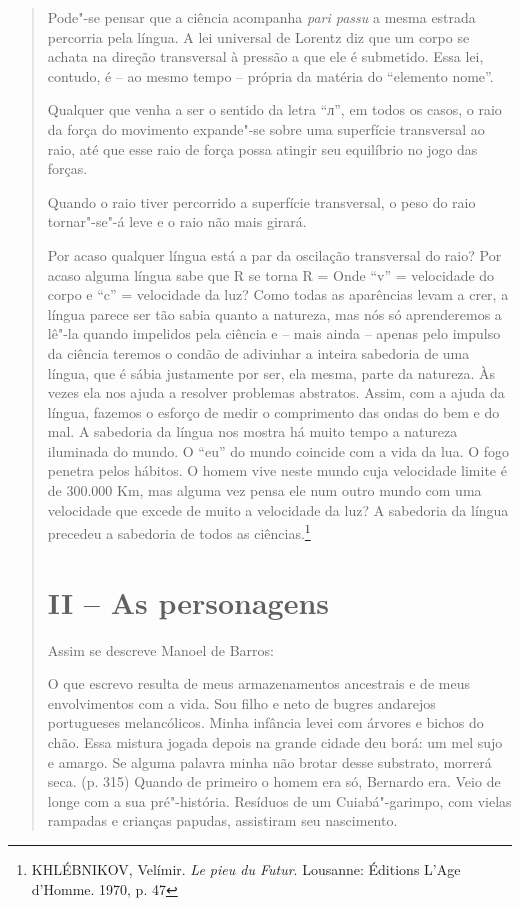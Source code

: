 \begin{quote}
Pode"-se pensar que a ciência acompanha \emph{pari passu} a mesma estrada
percorria pela língua. A lei universal de Lorentz diz que um corpo se
achata na direção transversal à pressão a que ele é submetido. Essa lei,
contudo, é -- ao mesmo tempo -- própria da matéria do ``elemento nome''.

Qualquer que venha a ser o sentido da letra ``л'', em todos os casos, o
raio da força do movimento expande"-se sobre uma superfície transversal
ao raio, até que esse raio de força possa atingir seu equilíbrio no jogo
das forças.

Quando o raio tiver percorrido a superfície transversal, o peso do raio
tornar"-se"-á leve e o raio não mais girará.

Por acaso qualquer língua está a par da oscilação transversal do raio?
Por acaso alguma língua sabe que R se torna R =
Onde ``v'' =
velocidade do corpo e ``c'' = velocidade da luz? Como todas as
aparências levam a crer, a língua parece ser tão sabia quanto a
natureza, mas nós só aprenderemos a lê"-la quando impelidos pela ciência
e -- mais ainda -- apenas pelo impulso da ciência teremos o condão de
adivinhar a inteira sabedoria de uma língua, que é sábia justamente por
ser, ela mesma, parte da natureza. Às vezes ela nos ajuda a resolver
problemas abstratos. Assim, com a ajuda da língua, fazemos o esforço de
medir o comprimento das ondas do bem e do mal. A sabedoria da língua nos
mostra há muito tempo a natureza iluminada do mundo. O ``eu'' do mundo
coincide com a vida da lua. O fogo penetra pelos hábitos. O homem vive
neste mundo cuja velocidade limite é de 300.000 Km, mas alguma vez pensa
ele num outro mundo com uma velocidade que excede de muito a velocidade
da luz? A sabedoria da língua precedeu a sabedoria de todos as
ciências.\footnote{KHLÉBNIKOV, Velímir. \emph{Le pieu du Futur}.
  Lousanne: Éditions L'Age d'Homme. 1970, p. 47}

\section{II -- As personagens}

Assim se descreve Manoel de Barros:

O que escrevo resulta de meus armazenamentos ancestrais e de meus
envolvimentos com a vida. Sou filho e neto de bugres andarejos
portugueses melancólicos. Minha infância levei com árvores e bichos do
chão. Essa mistura jogada depois na grande cidade deu borá: um mel sujo
e amargo. Se alguma palavra minha não brotar desse substrato, morrerá
seca. (p. 315) Quando de primeiro o homem era só, Bernardo era. Veio de
longe com a sua pré"-história. Resíduos de um Cuiabá"-garimpo, com vielas
rampadas e crianças papudas, assistiram seu nascimento.


\end{quote}
